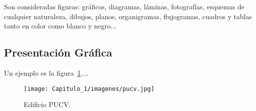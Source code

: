      Son consideradas figuras: gráficos, diagramas, láminas, fotografías,
esquemas de cualquier naturaleza, dibujos, planos, organigramas, flujogramas,
cuadros y tablas tanto en color como blanco y negro...

\subsection{Presentación Gráfica}
       
Un ejemplo es la figura~\ref{fig:pucv}....


\begin{figure}[!htbp]
\begin{center}
\texttt{[image: Capitulo\_1/imagenes/pucv.jpg]} 
\caption{Edificio PUCV.}\label{fig:pucv}
\end{center}
\end{figure}